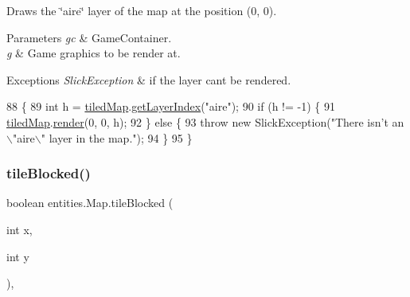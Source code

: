 Draws the \char`\"{}aire\char`\"{} layer of the map at the position (0, 0).


\begin{DoxyParams}{Parameters}
{\em gc} & Game\+Container. \\
\hline
{\em g} & Game graphics to be render at. \\
\hline
\end{DoxyParams}

\begin{DoxyExceptions}{Exceptions}
{\em Slick\+Exception} & if the layer can\textquotesingle{}t be rendered. \\
\hline
\end{DoxyExceptions}

\begin{DoxyCode}
88                                                                                \{
89         \textcolor{keywordtype}{int} h = \mbox{\hyperlink{classentities_1_1_map_a94a743ccd80946422fcbdb5ba1cc966b}{tiledMap}}.\mbox{\hyperlink{classorg_1_1newdawn_1_1slick_1_1tiled_1_1_tiled_map_a70c72f5ad1f0fb784c6bfd0dc71d0608}{getLayerIndex}}(\textcolor{stringliteral}{"aire"});
90         \textcolor{keywordflow}{if} (h != -1) \{
91             \mbox{\hyperlink{classentities_1_1_map_a94a743ccd80946422fcbdb5ba1cc966b}{tiledMap}}.\mbox{\hyperlink{classorg_1_1newdawn_1_1slick_1_1tiled_1_1_tiled_map_a313dd901616b31c772f213675d236389}{render}}(0, 0, h);
92         \} \textcolor{keywordflow}{else} \{
93             \textcolor{keywordflow}{throw} \textcolor{keyword}{new} SlickException(\textcolor{stringliteral}{"There isn't an \(\backslash\)"aire\(\backslash\)" layer in the map."});
94         \}
95     \}
\end{DoxyCode}
\mbox{\label{classentities_1_1_map_abcb73d4364f31f5dd9a251ab59942919}} 
\subsubsection{\texorpdfstring{tile\+Blocked()}{tileBlocked()}}
{\footnotesize\ttfamily boolean entities.\+Map.\+tile\+Blocked (\begin{DoxyParamCaption}\item[{int}]{x,  }\item[{int}]{y }\end{DoxyParamCaption})\hspace{0.3cm}{\ttfamily [inline]}, {\ttfamily [private]}}

